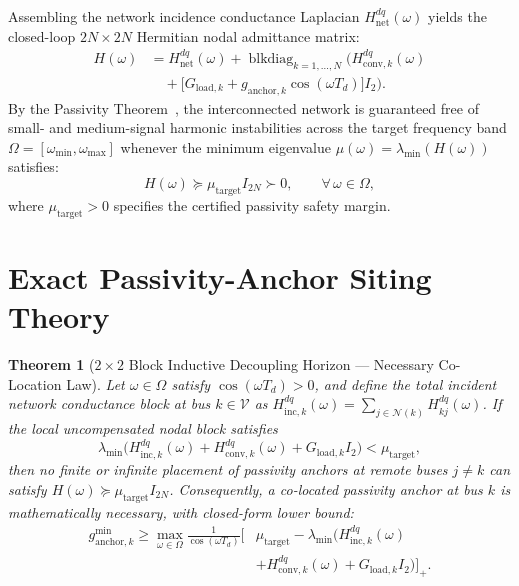 \documentclass[10pt,twocolumn]{article}
\newtheorem{theorem}{Theorem}
\begin{document}
Assembling the network incidence conductance Laplacian $H_{\text{net}}^{dq}(\omega)$ yields the closed-loop $2N\times 2N$ Hermitian nodal admittance matrix:
\begin{equation}
\begin{aligned}
H(\omega) &= H_{\text{net}}^{dq}(\omega) + \operatorname{blkdiag}_{k=1,\dots,N}\!\Big(H_{\text{conv},k}^{dq}(\omega) \\
&\quad + \big[G_{\text{load},k} + g_{\text{anchor},k}\cos(\omega T_d)\big]I_2\Big).
\end{aligned}
\label{eq:hfull}
\end{equation}
By the Passivity Theorem~\cite{harnefors2016passivity}, the interconnected network is guaranteed free of small- and medium-signal harmonic instabilities across the target frequency band $\Omega=[\omega_{\min},\omega_{\max}]$ whenever the minimum eigenvalue $\mu(\omega)=\lambda_{\min}(H(\omega))$ satisfies:
\begin{equation}
H(\omega) \succeq \mu_{\text{target}} I_{2N} \succ 0, \qquad \forall\,\omega\in\Omega,
\label{eq:passivity_cond}
\end{equation}
where $\mu_{\text{target}}>0$ specifies the certified passivity safety margin.

\section{Exact Passivity-Anchor Siting Theory}

\begin{theorem}[$2\times 2$ Block Inductive Decoupling Horizon --- Necessary Co-Location Law]
\label{thm:horizon}
Let $\omega\in\Omega$ satisfy $\cos(\omega T_d)>0$, and define the total incident network conductance block at bus $k\in\mathcal{V}$ as $H_{\text{inc},k}^{dq}(\omega)=\sum_{j\in\mathcal{N}(k)} H_{kj}^{dq}(\omega)$. If the local uncompensated nodal block satisfies
\begin{equation}
\lambda_{\min}\!\Big(H_{\text{inc},k}^{dq}(\omega) + H_{\text{conv},k}^{dq}(\omega) + G_{\text{load},k} I_2\Big) < \mu_{\text{target}},
\label{eq:thm1_cond}
\end{equation}
then no finite or infinite placement of passivity anchors at remote buses $j\neq k$ can satisfy $H(\omega)\succeq\mu_{\text{target}} I_{2N}$. Consequently, a co-located passivity anchor at bus $k$ is mathematically necessary, with closed-form lower bound:
\begin{equation}
\begin{aligned}
g_{\text{anchor},k}^{\min} \ge \max_{\omega\in\Omega} \frac{1}{\cos(\omega T_d)}\Big[&\mu_{\text{target}} - \lambda_{\min}\!\big(H_{\text{inc},k}^{dq}(\omega) \\
&+ H_{\text{conv},k}^{dq}(\omega) + G_{\text{load},k} I_2\big)\Big]_+.
\end{aligned}
\label{eq:thm1_bound}
\end{equation}
\end{theorem}
\end{document}
